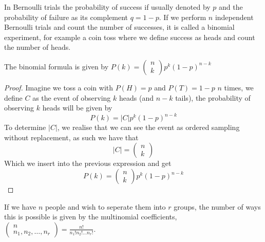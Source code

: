 In Bernoulli trials the probability of success if usually denoted by $p$ and the probability of failure as its complement $q=1-p$. If we perform $n$ independent Bernoulli trials and count the number of successes, it is called a binomial experiment, for example a coin toss where we define success as heads and count the number of heads. 
\begin{theorem}
    The binomial formula is given by $P(k)=\begin{pmatrix}n\\k\end{pmatrix}p^{k}(1-p)^{n-k}$
\end{theorem}
\begin{proof}
    Imagine we toss a coin with $P(H)=p$ and $P(T)=1-p$ $n$ times, we define $C$ as the event of observing $k$ heads (and $n-k$ tails), the probability of observing $k$ heads will be given by
    \[
        P(k)=|C|p^{k}(1-p)^{n-k}
    \]
    To determine $|C|$, we realise that we can see the event as ordered sampling without replacement, as such we have that
    \[
        |C|=\begin{pmatrix}n\\k\end{pmatrix}
    \]
    Which we insert into the previous expression and get
    \[
        P(k)=\begin{pmatrix}n\\k\end{pmatrix}p^{k}(1-p)^{n-k}
    \]
\end{proof}
\begin{theorem}
  If we have $n$ people and wish to seperate them into $r$ groups, the number of ways this is possible is given by the multinomial coefficients, $\begin{pmatrix}n\\n_{1},n_{2},\ldots,n_{r}\end{pmatrix}=\frac{n!}{n_{1}!n_{2}!\ldots n_{r}!}$.
\end{theorem}
